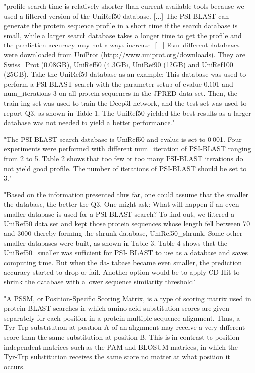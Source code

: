 	"profile search time is relatively shorter than current available tools because we used a filtered version of the UniRef50 database. [...]
	The PSI-BLAST can generate the protein sequence profile in a short time if the search database is small, while a larger search database takes a longer time to get the profile and the prediction accuracy may not always increase. [...] Four different databases were downloaded from UniProt (http://www.uniprot.org/downloads). They are Swiss\_Prot (0.08GB), UniRef50 (4.3GB), UniRef90 (12GB) and UniRef100 (25GB). Take the UniRef50 database as an example: This database was used to perform a PSI-BLAST search with the parameter setup of evalue 0.001 and num\_iterations 3 on all protein sequences in the JPRED data set. Then, the train-ing set was used to train the Deep3I network, and the test set was used to report Q3, as shown in Table 1. The UniRef50 yielded the best results as a larger database was not needed to yield a better performance." \cite{Fang2017}

	"The PSI-BLAST search database is UniRef50 and evalue is set to 0.001. Four experiments were performed with different num\_iteration of PSI-BLAST ranging from 2 to 5. Table 2 shows that too few or too many PSI-BLAST iterations do not yield good profile. The number of iterations of PSI-BLAST should be set to 3." \cite{Fang2017}

	"Based on the information presented thus far, one could assume that the smaller the database, the better the Q3. One might ask: What will happen if an even smaller database is used for a PSI-BLAST search? To find out, we filtered a UniRef50 data set and kept those protein sequences whose length fell between 70 and 3000 thereby forming the shrunk database, UniRef50\_shrunk. Some other smaller databases were built, as shown in Table 3. Table 4 shows that the UniRef50\_smaller was sufficient for PSI- BLAST to use as a database and saves computing time. But when the da- tabase became even smaller, the prediction accuracy started to drop or fail. Another option would be to apply CD-Hit to shrink the database with a lower sequence similarity threshold" \cite{Fang2017}

	"A PSSM, or Position-Specific Scoring Matrix, is a type of scoring matrix used in protein BLAST searches in which amino acid substitution scores are given separately for each position in a protein multiple sequence alignment. Thus, a Tyr-Trp substitution at position A of an alignment may receive a very different score than the same substitution at position B. This is in contrast to position-independent matrices such as the PAM and BLOSUM matrices, in which the Tyr-Trp substitution receives the same score no matter at what position it occurs.
	
